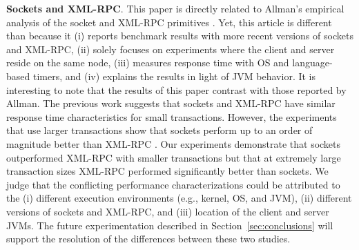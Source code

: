 \documentclass{sig-alternate}
\begin{document}
{\bf Sockets and XML-RPC}. This paper is directly related to Allman's
empirical analysis of the socket and XML-RPC primitives
\cite{allman-per}.  Yet, this article is different than
\cite{allman-per} because it (i) reports benchmark results with more
recent versions of sockets and XML-RPC, (ii) solely focuses on
experiments where the client and server reside on the same node, (iii)
measures response time with OS and language-based timers, and (iv)
explains the results in light of JVM behavior.  It is interesting to
note that the results of this paper contrast with those reported by
Allman.  The previous work suggests that sockets and XML-RPC have
similar response time characteristics for small transactions.
However, the experiments that use larger transactions show that
sockets perform up to an order of magnitude better than XML-RPC
\cite{allman-per}.  Our experiments demonstrate that sockets
outperformed XML-RPC with smaller transactions but that at extremely
large transaction sizes XML-RPC performed significantly better than
sockets.  We judge that the conflicting performance characterizations
could be attributed to the (i) different execution environments (e.g.,
kernel, OS, and JVM), (ii) different versions of sockets and XML-RPC,
and (iii) location of the client and server JVMs.  The future
experimentation described in Section~\ref{sec:conclusions} will
support the resolution of the differences between these two studies.


\end{document}
